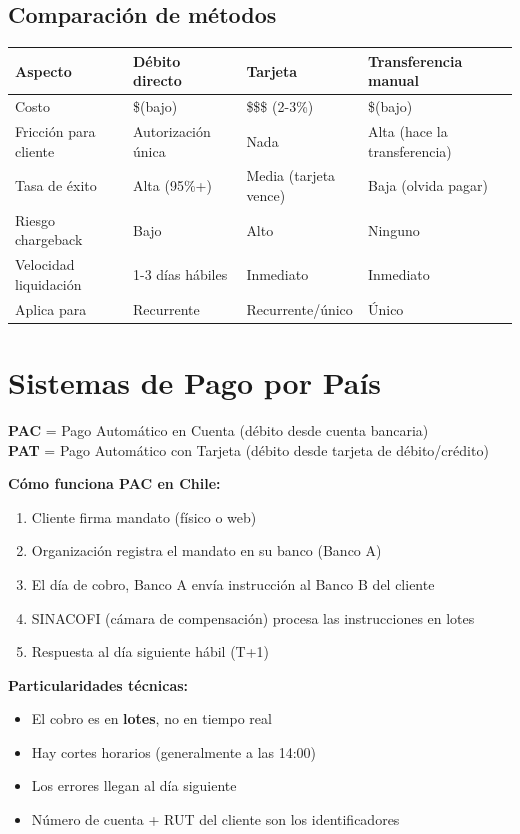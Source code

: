 \documentclass[11pt,a4paper]{article}
\begin{document}
\subsection{Comparación de métodos}

\begin{center}
\begin{tabular}{p{3cm}p{4cm}p{4cm}p{3cm}}
\toprule
\textbf{Aspecto} & \textbf{Débito directo} & \textbf{Tarjeta} & \textbf{Transferencia manual} \\
\midrule
Costo & \$\quad (bajo) & \$\$\$ (2-3\%) & \$\quad (bajo) \\
Fricción para cliente & Autorización única & Nada & Alta (hace la transferencia) \\
Tasa de éxito & Alta (95\%+) & Media (tarjeta vence) & Baja (olvida pagar) \\
Riesgo chargeback & Bajo & Alto & Ninguno \\
Velocidad liquidación & 1-3 días hábiles & Inmediato & Inmediato \\
Aplica para & Recurrente & Recurrente/único & Único \\
\bottomrule
\end{tabular}
\end{center}

\section{Sistemas de Pago por País}

\begin{clbox}
\textbf{PAC} = Pago Automático en Cuenta (débito desde cuenta bancaria)\\
\textbf{PAT} = Pago Automático con Tarjeta (débito desde tarjeta de débito/crédito)

\vspace{6pt}
\textbf{Cómo funciona PAC en Chile:}
\begin{enumerate}
  \item Cliente firma mandato (físico o web)
  \item Organización registra el mandato en su banco (Banco A)
  \item El día de cobro, Banco A envía instrucción al Banco B del cliente
  \item SINACOFI (cámara de compensación) procesa las instrucciones en lotes
  \item Respuesta al día siguiente hábil (T+1)
\end{enumerate}

\textbf{Particularidades técnicas:}
\begin{itemize}
  \item El cobro es en \textbf{lotes}, no en tiempo real
  \item Hay cortes horarios (generalmente a las 14:00)
  \item Los errores llegan al día siguiente
  \item Número de cuenta + RUT del cliente son los identificadores
\end{itemize}
\end{clbox}
\end{document}
